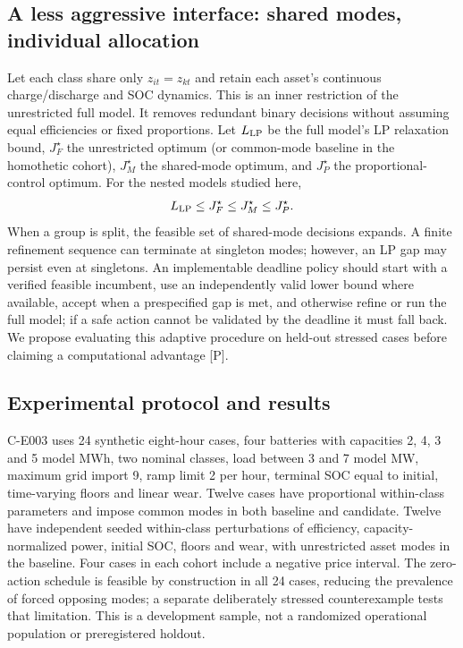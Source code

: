 \documentclass[11pt,letterpaper]{article}
\begin{document}
\subsection{A less aggressive interface: shared modes, individual allocation}
Let each class share only $z_{it}=z_{kt}$ and retain each asset's continuous charge/discharge and SOC dynamics. This is an inner restriction of the unrestricted full model. It removes redundant binary decisions without assuming equal efficiencies or fixed proportions. Let $L_{\rm LP}$ be the full model's LP relaxation bound, $J_F^\star$ the unrestricted optimum (or common-mode baseline in the homothetic cohort), $J_M^\star$ the shared-mode optimum, and $J_P^\star$ the proportional-control optimum. For the nested models studied here,
\[
L_{\rm LP}\le J_F^\star\le J_M^\star\le J_P^\star.
\]
When a group is split, the feasible set of shared-mode decisions expands. A finite refinement sequence can terminate at singleton modes; however, an LP gap may persist even at singletons. An implementable deadline policy should start with a verified feasible incumbent, use an independently valid lower bound where available, accept when a prespecified gap is met, and otherwise refine or run the full model; if a safe action cannot be validated by the deadline it must fall back. We propose evaluating this adaptive procedure on held-out stressed cases before claiming a computational advantage [P].

\subsection{Experimental protocol and results}
C-E003 uses 24 synthetic eight-hour cases, four batteries with capacities 2, 4, 3 and 5 model MWh, two nominal classes, load between 3 and 7 model MW, maximum grid import 9, ramp limit 2 per hour, terminal SOC equal to initial, time-varying floors and linear wear. Twelve cases have proportional within-class parameters and impose common modes in both baseline and candidate. Twelve have independent seeded within-class perturbations of efficiency, capacity-normalized power, initial SOC, floors and wear, with unrestricted asset modes in the baseline. Four cases in each cohort include a negative price interval. The zero-action schedule is feasible by construction in all 24 cases, reducing the prevalence of forced opposing modes; a separate deliberately stressed counterexample tests that limitation. This is a development sample, not a randomized operational population or preregistered holdout.
\end{document}
